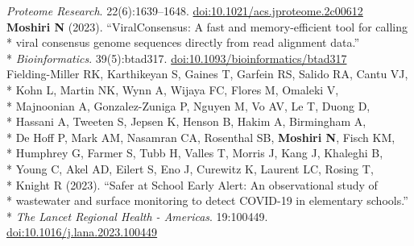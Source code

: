 \documentclass[margin,line]{res}
\begin{document}
\begin{resume}
\hspace*{8mm} \textit{Proteome Research}. 22(6):1639--1648. \href{https://doi.org/10.1021/acs.jproteome.2c00612}{doi:10.1021/acs.jproteome.2c00612}\\
\hspace*{4mm} \textbf{Moshiri N} (2023). ``ViralConsensus: A fast and memory-efficient tool for calling\\*
\hspace*{9mm} viral consensus genome sequences directly from read alignment data.''\\*\vspace{2mm}
\hspace*{8mm} \textit{Bioinformatics}. 39(5):btad317. \href{https://doi.org/10.1093/bioinformatics/btad317}{doi:10.1093/bioinformatics/btad317}\\
\hspace*{4mm} Fielding-Miller RK, Karthikeyan S, Gaines T, Garfein RS, Salido RA, Cantu VJ,\\*
\hspace*{9mm} Kohn L, Martin NK, Wynn A, Wijaya FC, Flores M, Omaleki V,\\*
\hspace*{9mm} Majnoonian A, Gonzalez-Zuniga P, Nguyen M, Vo AV, Le T, Duong D,\\*
\hspace*{9mm} Hassani A, Tweeten S, Jepsen K, Henson B, Hakim A, Birmingham A,\\*
\hspace*{9mm} De Hoff P, Mark AM, Nasamran CA, Rosenthal SB, \textbf{Moshiri N}, Fisch KM,\\*
\hspace*{9mm} Humphrey G, Farmer S, Tubb H, Valles T, Morris J, Kang J, Khaleghi B,\\*
\hspace*{9mm} Young C, Akel AD, Eilert S, Eno J, Curewitz K, Laurent LC, Rosing T,\\*
\hspace*{9mm} Knight R (2023). ``Safer at School Early Alert: An observational study of\\*
\hspace*{9mm} wastewater and surface monitoring to detect COVID-19 in elementary schools.''\\*\vspace{2mm}
\hspace*{8mm} \textit{The Lancet Regional Health - Americas}. 19:100449. \href{https://doi.org/10.1016/j.lana.2023.100449}{doi:10.1016/j.lana.2023.100449}\\

\end{resume}
\end{document}
